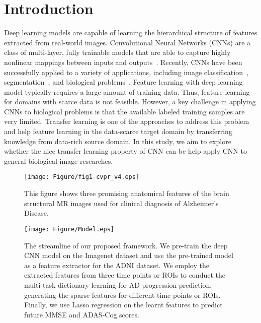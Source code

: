 \documentclass[10pt,twocolumn,letterpaper]{article}
\begin{document}
\vspace{-1.5em}
\section{Introduction}
Deep learning models \cite{sharif2014cnn, zeiler2014visualizing, zhang2015deep} are capable of learning the hierarchical structure of features extracted from real-world images. Convolutional Neural Networks (CNNs) are a class of multi-layer, fully trainable models that are able to capture highly nonlinear mappings between inputs and outputs~\cite{lecun1998gradient}. Recently, CNNs have been successfully applied to a variety of applications, including image classification~\cite{krizhevsky2012imagenet}, segmentation~\cite{turaga2010convolutional}, and biological problems~\cite{hazlett2017early}. Feature learning with deep learning model typically requires a large amount of training data. Thus, feature learning for domains with scarce data is not feasible. However, a key challenge in applying CNNs to biological problems is that the available labeled training samples are very limited. Transfer learning \cite{blitzer2006domain, pan2010survey, zhang2011deep} is one of the approaches to address this problem and help feature learning in the data-scarce target domain by transferring knowledge from data-rich source domain. In this study, we aim to explore whether the nice transfer learning property of CNN can be help apply CNN to general biological image researches.

\begin{figure}[t]
\centering
\texttt{[image: Figure/fig1-cvpr\_v4.eps]}
\caption{This figure shows three promising anatomical features of the brain structural MR images used for clinical diagnosis of Alzheimer's Disease.}
\vspace{-1.5em}
\label{fig:1}
\end{figure}

\begin{figure*}[t]
\vspace{-1em}
\centering
\texttt{[image: Figure/Model.eps]}
\caption{The streamline of our proposed framework. We pre-train the deep CNN model on the Imagenet dataset and use the pre-trained model as a feature extractor for the ADNI dataset. We employ the extracted features from three time points or ROIs to conduct the multi-task dictionary learning for AD progression prediction, generating the sparse features for different time points or ROIs. Finally, we use Lasso regression on the learnt features to predict future MMSE and ADAS-Cog scores.}
\label{fig:2}
\vspace{-1em}
\end{figure*}
\end{document}
